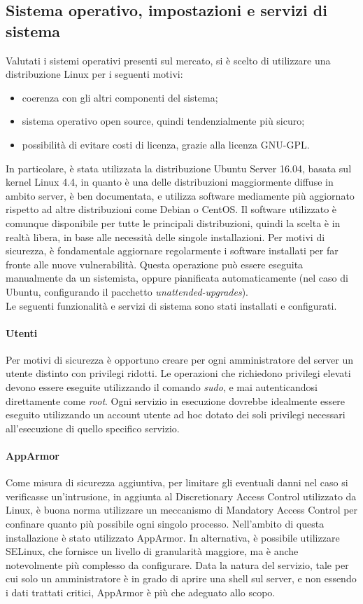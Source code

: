 \subsection{Sistema operativo, impostazioni e servizi di sistema}
Valutati i sistemi operativi presenti sul mercato, si è scelto di utilizzare una distribuzione Linux per i seguenti motivi:
\begin{itemize}
 \item coerenza con gli altri componenti del sistema;
 \item sistema operativo open source, quindi tendenzialmente più sicuro;
 \item possibilità di evitare costi di licenza, grazie alla licenza GNU-GPL.
\end{itemize}
In particolare, è stata utilizzata la distribuzione Ubuntu Server 16.04, basata sul kernel Linux 4.4, in quanto è una delle distribuzioni maggiormente diffuse in ambito server, è ben documentata, e utilizza software mediamente più aggiornato rispetto ad altre distribuzioni come Debian o CentOS.
Il software utilizzato è comunque disponibile per tutte le principali distribuzioni, quindi la scelta è in realtà libera, in base alle necessità delle singole installazioni.
Per motivi di sicurezza, è fondamentale aggiornare regolarmente i software installati per far fronte alle nuove vulnerabilità.
Questa operazione può essere eseguita manualmente da un sistemista, oppure pianificata automaticamente (nel caso di Ubuntu, configurando il pacchetto \textit{unattended-upgrades}).
\\Le seguenti funzionalità e servizi di sistema sono stati installati e configurati.
\paragraph{Utenti}
Per motivi di sicurezza è opportuno creare per ogni amministratore del server un utente distinto con privilegi ridotti.
Le operazioni che richiedono privilegi elevati devono essere eseguite utilizzando il comando \textit{sudo}, e mai autenticandosi direttamente come \textit{root}.
Ogni servizio in esecuzione dovrebbe idealmente essere eseguito utilizzando un account utente ad hoc dotato dei soli privilegi necessari all'esecuzione di quello specifico servizio.
\paragraph{AppArmor}
Come misura di sicurezza aggiuntiva, per limitare gli eventuali danni nel caso si verificasse un'intrusione, in aggiunta al Discretionary Access Control utilizzato da Linux, è buona norma utilizzare un meccanismo di Mandatory Access Control per confinare quanto più possibile ogni singolo processo.
Nell'ambito di questa installazione è stato utilizzato AppArmor. In alternativa, è possibile utilizzare SELinux, che fornisce un livello di granularità maggiore, ma è anche notevolmente più complesso da configurare.
Data la natura del servizio, tale per cui solo un amministratore è in grado di aprire una shell sul server, e non essendo i dati trattati critici, AppArmor è più che adeguato allo scopo.
